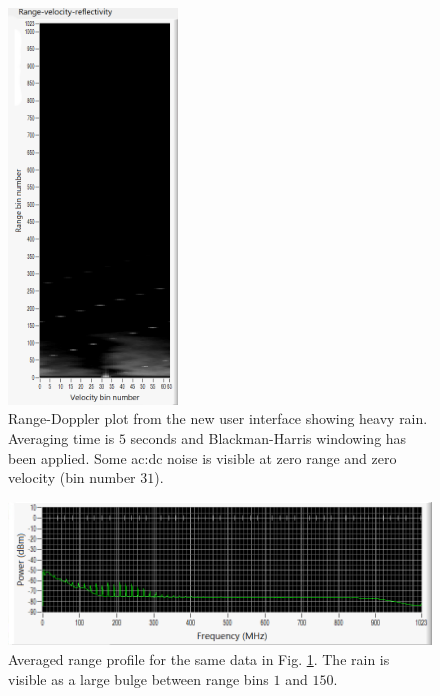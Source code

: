 \documentclass{article}
\begin{document}
\begin{figure}[h]
	\centering
	\includegraphics[width=0.4\textwidth]{working-heavy-rain-sleet_range-doppler}
	\caption{Range-Doppler plot from the new user interface showing heavy rain. Averaging time is \(5\) seconds and Blackman-Harris windowing has been applied. Some \acrshort{ac:dc} noise is visible at zero range and zero velocity (bin number \(31\)).}
	\label{fig:WorkingHeavyRainSnowRangeDoppler}
\end{figure}

\begin{figure}[h]
	\centering
	\includegraphics[width=\textwidth]{working-heavy-rain-sleet_power-spect}
	\caption{Averaged range profile for the same data in Fig. \ref{fig:WorkingHeavyRainSnowRangeDoppler}. The rain is visible as a large bulge between range bins \(1\) and \(150\).}
	\label{fig:WorkingHeavyRainSnowPowerSpectrum}
\end{figure}
\end{document}
